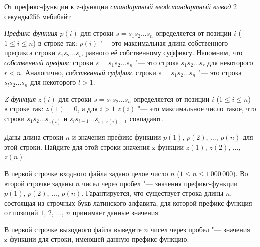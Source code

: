
\begin{problem}{От префикс-функции к z-функции}
{\textsl{стандартный ввод}}{\textsl{стандартный вывод}}
{2 секунды}{256 мебибайт}{}

\textit{Префикс-функция} $p (i)$ для строки $s = s_1 s_2 \ldots s_n$
определяется от позиции $i$ ($1 \le i \le n$) в строке так:
$p (i)$ "--- это максимальная длина собственного префикса строки
$s_1 s_2 \ldots s_i$, равного её собственному суффиксу.
Напомним, что \textit{собственный префикс} строки $s = s_1 s_2 \ldots s_n$
"--- это строка $s_1 s_2 \ldots s_r$ для некоторого $r < n$.
Аналогично, \textit{собственный суффикс} строки $s = s_1 s_2 \ldots s_n$
"--- это строка $s_l s_2 \ldots s_n$ для некоторого $l > 1$.

\textit{Z-функция} $z (i)$ для строки $s = s_1 s_2 \ldots s_n$
определяется от позиции $i$ ($1 \le i \le n$) в строке так:
$z (1) = 0$, а для $i > 1$ $z (i)$ "--- это максимальное число такое,
что строки $s_1 s_2 \ldots s_{z (i)}$
и $s_i s_{i + 1} \ldots s_{i + z (i) - 1}$ совпадают.

Даны длина строки $n$ и значения префикс-функции
$p (1)$, $p (2)$, $\ldots$, $p (n)$ для этой строки.
Найдите для этой строки значения z-функции
$z (1)$, $z (2)$, $\ldots$, $z (n)$.

\InputFile

В первой строчке входного файла задано целое число $n$
($1 \le n \le 1\,000\,000$).
Во второй строчке заданы $n$ чисел через пробел "--- значения префикс-функции
$p (1)$, $p (2)$, $\ldots$, $p (n)$.
Гарантируется, что существует строка длины $n$, состоящая
из строчных букв латинского алфавита, для которой префикс-функция
от позиций $1$, $2$, $\ldots$, $n$ принимает данные значения.

\OutputFile

В первой строчке выходного файла выведите $n$ чисел через пробел "---
значения z-функции для строки, имеющей данную префикс-функцию.

\Examples

\begin{example}
%
%
%
\end{example}

\end{problem}
